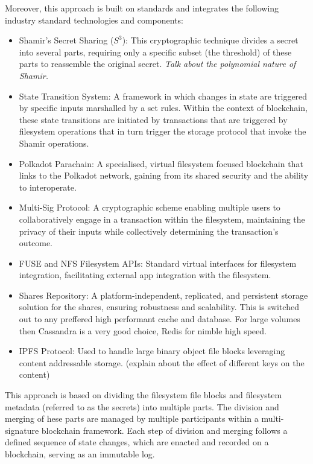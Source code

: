\documentclass{tufte-handout}
\begin{document}
Moreover, this approach is built on standards and integrates the following industry standard technologies and components:
\begin{itemize}
    \item Shamir's Secret Sharing ($S^3$): This cryptographic technique divides a secret into several parts, requiring only a specific subset (the threshold) of
    these parts to reassemble the original secret. \textit{Talk about the polynomial nature of Shamir.}
    \item State Transition System: A framework in which changes in state are triggered by specific inputs marshalled by a set rules. Within the context of blockchain,
    these state transitions are initiated by transactions that are triggered by filesystem operations that in turn trigger the storage protocol that invoke the Shamir
    operations.
    \item Polkadot Parachain: A specialised, virtual filesystem focused blockchain that links to the Polkadot network, gaining from its shared security and the ability
    to interoperate.
    \item Multi-Sig Protocol: A cryptographic scheme enabling multiple users to collaboratively engage in a transaction within the filesystem, maintaining
    the privacy of their inputs while collectively determining the transaction's outcome.
    \item FUSE and NFS Filesystem APIs: Standard virtual interfaces for filesystem integration, facilitating external app integration with the filesystem.
    \item Shares Repository: A platform-independent, replicated, and persistent storage solution for the shares, ensuring robustness and scalability. This
    is switched out to any preffered high performant cache and database. For large volumes then Cassandra is a very good choice, Redis for nimble high speed.
    \item IPFS Protocol: Used to handle large binary object file blocks leveraging content addressable storage. (explain about the effect of different keys on the content)
\end{itemize}

This approach is based on dividing the filesystem file blocks and filesystem metadata (referred to as the secrets) into multiple parts. The division and merging of 
hese parts are managed by multiple participants within a multi-signature blockchain framework. Each step of division and merging follows a defined sequence of
state changes, which are enacted and recorded on a blockchain, serving as an immutable log.
\end{document}
